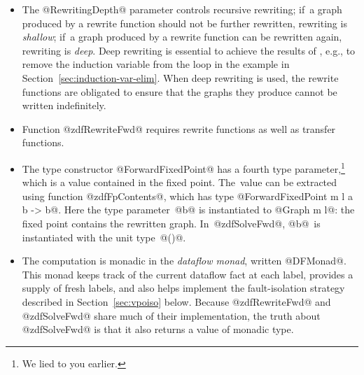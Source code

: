 \documentclass[blockstyle,preprint,nocopyrightspace]{sigplanconf}
\newcommand{\authornote}[1]{{\em #1}}
\def\authornote#1{\unskip\relax}
\newcommand{\simon}[1]{\authornote{SLPJ: #1}}
\newcommand\secref[1]{Section~\ref{sec:#1}}
\newcommand\seclabel[1]{\label{sec:#1}}
\begin{document}
\begin{itemize}
\item
The @RewritingDepth@ parameter controls recursive rewriting;
if~a graph produced by a rewrite function should not be further rewritten,
rewriting is \emph{shallow};
if~a graph produced by a rewrite function can be rewritten again,
rewriting is \emph{deep}.
Deep rewriting is essential to achieve the results of
\citet{lerner-grove-chambers:2002}, e.g., to remove the induction
variable from the loop in the example in \secref{induction-var-elim}.
When deep rewriting is used, the rewrite functions are obligated to
ensure that the graphs they produce cannot be written indefinitely.
\item
Function @zdfRewriteFwd@ requires rewrite functions as well as transfer
functions.
\item
The type constructor @ForwardFixedPoint@ has a fourth
type parameter,\footnote
{We lied to you earlier.}
which is a value contained in the fixed point.
The~value can be extracted using function @zdfFpContents@, which has
type @ForwardFixedPoint m l a b -> b@.
Here the type parameter~@b@ is instantiated to @Graph m l@: the fixed point
contains the rewritten graph.
In~@zdfSolveFwd@, @b@~is instantiated with
the unit type~@()@.
\item
The computation is monadic in the \emph{dataflow monad}, written
@DFMonad@.
This monad keeps track of the current dataflow fact at each label,
provides a supply of fresh labels, 
and
also helps implement the fault-isolation strategy described
in \secref{vpoiso} below.
Because @zdfRewriteFwd@ and @zdfSolveFwd@ share much of their
implementation, the truth 
about @zdfSolveFwd@ is that it also returns a value of monadic type.
\end{itemize}


\seclabel{dfengine-spec}
\end{document}
